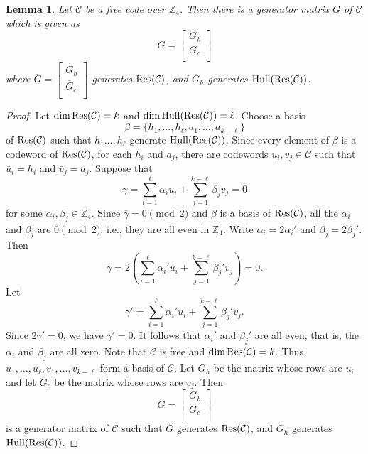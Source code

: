 \documentclass{article}
\newtheorem{lemma}[theorem]{Lemma}
\theoremstyle{definition}
\theoremstyle{remark}
\begin{document}
\begin{lemma}\label{matrixform}
Let $\mathcal C$ be a free code over $\mathbb Z_4$. Then there is a generator matrix $G$ of $\mathcal{C}$ which is given as
\[
    G=
    \begin{bmatrix}
        G_{h}\\
        G_{c}\\
    \end{bmatrix}
\]
where $\overline{G}=\begin{bmatrix}
        \overline{G}_{h}\\
        \overline{G}_{c}\\
    \end{bmatrix}$ generates ${\rm Res}(\mathcal{C})$, and $\overline{G}_{h}$ generates ${\rm{Hull}}({\rm Res}(\mathcal{C}))$.
\end{lemma}
\begin{proof}
    Let $\dim {\rm Res}(\mathcal{C})=k$ and $\dim {\rm{Hull}}({\rm Res}(\mathcal{C}))=\ell$. Choose a basis
    \[
    \beta=\{h_1, \ldots, h_\ell, a_1,\ldots, a_{k-\ell}\}
    \]
    of ${\rm Res}(\mathcal{C})$ such that $h_1\ldots, h_\ell$ generate ${\rm{Hull}}({\rm Res}(\mathcal{C}))$. Since every element of $\beta$ is a codeword of ${\rm Res}(\mathcal{C})$, for each $h_i$ and $a_j$, there are codewords $u_i, v_j\in\mathcal{C}$ such that $\bar{u}_i=h_i$ and $\bar{v}_j=a_j$. Suppose that
    \[
    \gamma=\sum_{i=1}^\ell \alpha_iu_i+\sum_{j=1}^{k-\ell}\beta_jv_j=0
    \]
    for some $\alpha_i, \beta_j\in\mathbb{Z}_4$. Since $\bar{\gamma}=0\pmod 2$ and $\beta$ is a basis of ${\rm Res}(\mathcal{C})$, all the $\alpha_i$ and $\beta_j$ are $0\pmod 2$, i.e., they are all even in $\mathbb{Z}_4$. Write $\alpha_i=2\alpha_i'$ and $\beta_j=2\beta_j'$. Then 
    \[
    \gamma=2\left(\sum_{i=1}^\ell \alpha_i'u_i+\sum_{j=1}^{k-\ell}\beta_j'v_j\right)=0.
    \]
    Let 
    \[
    \gamma'=\sum_{i=1}^\ell \alpha_i'u_i+\sum_{j=1}^{k-\ell}\beta_j'v_j.
    \]
    Since $2\gamma'=0$, we have $\overline{\gamma'}=0$. It follows that $\alpha_i'$ and $\beta_j'$ are all even, that is, the $\alpha_i$ and $\beta_j$ are all zero. Note that $\mathcal{C}$ is free and $\dim {\rm Res}(\mathcal{C})=k$. Thus, $u_1, \ldots, u_\ell, v_1, \ldots, v_{k-\ell}$ form a basis of $\mathcal{C}$. Let $G_h$ be the matrix whose rows are $u_i$ and let $G_c$ be the matrix whose rows are $v_j$. Then 
    \[
    G=
    \begin{bmatrix}
        G_{h}\\
        G_{c}\\
    \end{bmatrix}
    \]
    is a generator matrix of $\mathcal{C}$ such that $\overline{G}$ generates ${\rm Res}(\mathcal{C})$, and $\overline{G}_{h}$ generates ${\rm{Hull}}({\rm Res}(\mathcal{C}))$.
\end{proof}
\end{document}
